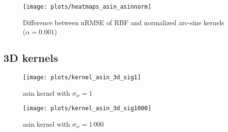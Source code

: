 \begin{figure}[H]
    \texttt{[image: plots/heatmaps\_asin\_asinnorm]}
    \caption{Difference between nRMSE of RBF and normalized arc-sine kernels ($\alpha=0.001$)}
    \label{fig:paired-ttest-asin-asinnorm-diff}
\end{figure}
%
%
%
%
%
%

\subsection{3D kernels}
\label{sub:3d_kernels}

\begin{figure}
    \texttt{[image: plots/kernel\_asin\_3d\_sig1]}
    \caption{asin kernel with $\sigma_w=1$}
\end{figure}

\begin{figure}
    \texttt{[image: plots/kernel\_asin\_3d\_sig1000]}
    \caption{asin kernel with $\sigma_w=1\,000$}
\end{figure}


